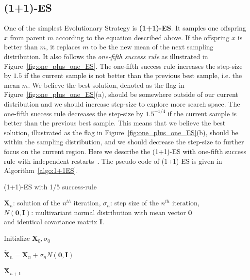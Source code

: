 \subsection{(1+1)-ES}
One of the simplest Evolutionary Strategy is \textbf{(1+1)-ES}.
It samples one offspring $x$ from parent $m$ according to the equation described above.
If the offspring $x$ is better than $m$, it replaces $m$ to be the new mean of the next sampling distribution.
It also follows the \textit{one-fifth success rule} as illustrated in Figure~\ref{fig:one_plus_one_ES}.
The one-fifth success rule increases the step-size by $1.5$ if the current sample is not better than the previous best sample, i.e. the mean $m$.
We believe the best solution, denoted as the flag in Figure~\ref{fig:one_plus_one_ES}(a), 
should be somewhere outside of our current distribution and we should increase step-size to explore more search space.
The one-fifth success rule decreases the step-size by $1.5^{-1/4}$ if the current sample is better than the previous best sample.
This means that we believe the best solution, illustrated as the flag in Figure~\ref{fig:one_plus_one_ES}(b),
should be within the sampling distribution, and we should decrease the step-size to further focus on the current region.
Here we describe the (1+1)-ES with one-fifth success rule with independent restarts~\cite{Auger:2009:one_plus_one_ES}.
The pseudo code of (1+1)-ES is given in Algorithm~\ref{algo:1+1ES}.

\begin{algorithm}%
\caption{(1+1)-ES with 1/5 success-rule}\label{algo:1+1ES}

$\boldsymbol{X}_{n}$: solution of the $n^{th}$ iteration, $\sigma_n$: step size of the $n^{th}$ iteration, \\
$N(\boldsymbol{0}, \boldsymbol{I})$: multivariant normal distribution with mean vector $\boldsymbol{0}$ \\ 
and identical covariance matrix $\boldsymbol{I}$.

\BlankLine
{} 

\BlankLine
Initialize $\boldsymbol{X}_0, \sigma_0$ \\
 {

    $\widetilde{\boldsymbol{X}}_n = \boldsymbol{X}_n + \sigma_n N(\boldsymbol{0}, \boldsymbol{I})$  \\

}

\Return $\boldsymbol{X}_{n+1}$

\end{algorithm}




